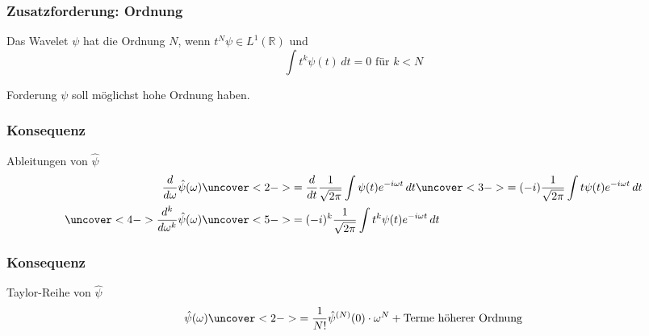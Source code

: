 %
%
\begin{frame}
\frametitle{Zusatzforderung: Ordnung}
\begin{definition}
Das Wavelet $\psi$ hat die Ordnung $N$, wenn $t^N\psi\in L^1(\mathbb R)$ und
\[
\int t^k \psi(t)\,dt = 0 \text{ für $k<N$}
\]
\end{definition}
\begin{block}{Forderung}
$\psi$ soll möglichst hohe Ordnung haben.
\end{block}
\end{frame}

%
%
\begin{frame}
\frametitle{Konsequenz}
\begin{block}{Ableitungen von $\hat{\psi}$}
\begin{align*}
\frac{d}{d\omega} \hat{\psi}(\omega)
&\uncover<2->{=
\frac{d}{dt}
\frac{1}{\sqrt{2\pi}}
\int \psi(t)e^{-i\omega t}\,dt}
\uncover<3->{=
(-i)
\frac{1}{\sqrt{2\pi}}
\int
t
\psi(t)e^{-i\omega t}\,dt}
\\
\uncover<4->{\frac{d^k}{d\omega^k} \hat{\psi}(\omega)}
&\uncover<5->{=
(-i)^k
\frac{1}{\sqrt{2\pi}}
\int
t^k
\psi(t)e^{-i\omega t}\,dt}
\end{align*}
\end{block}
\end{frame}


\begin{frame}
\frametitle{Konsequenz}
\begin{block}{Taylor-Reihe von $\hat{\psi}$}
\[
\hat{\psi}(\omega)
\uncover<2->{
= \frac{1}{N!}\hat{\psi}^{(N)}(0)\cdot\omega^N
+\text{Terme höherer Ordnung}
}
\]
\end{block}

\end{frame}


